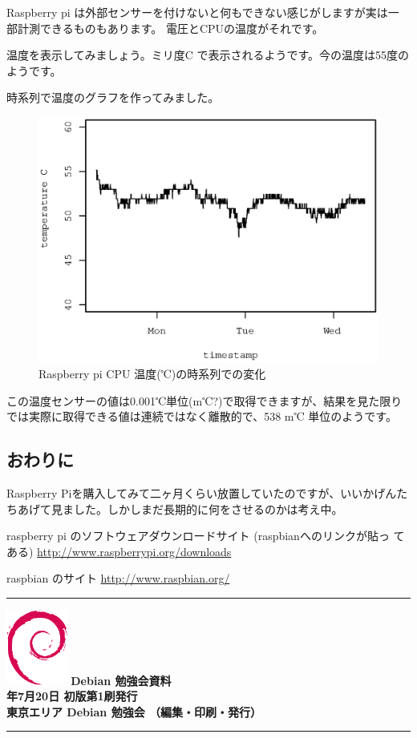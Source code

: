\documentclass[mingoth,a4paper]{jsarticle}
\newcommand{\debmtgyear}{2013}
\newcommand{\debmtgmonth}{7}
\newcommand{\debmtgdate}{20}
\begin{document}
Raspberry pi は外部センサーを付けないと何もできない感じがしますが実は一
部計測できるものもあります。
電圧とCPUの温度がそれです。

温度を表示してみましょう。ミリ度C で表示されるようです。今の温度は55度の
ようです。

時系列で温度のグラフを作ってみました。

\begin{figure}[H]
 \begin{center}
  \includegraphics[width=0.5\hsize]{image201307/temperature.eps}
  \caption{Raspberry pi CPU 温度(℃)の時系列での変化}
 \end{center}
\end{figure}

この温度センサーの値は0.001℃単位(m℃?)で取得できますが、結果を見た限り
では実際に取得できる値は連続ではなく離散的で、538 m℃ 単位のようです。

\subsection{おわりに}

Raspberry Piを購入してみて二ヶ月くらい放置していたのですが、いいかげんた
ちあげて見ました。しかしまだ長期的に何をさせるのかは考え中。

\begin{thebibliography}{}
  raspberry pi のソフトウェアダウンロードサイト (raspbianへのリンクが貼っ
てある)
\url{http://www.raspberrypi.org/downloads}
 
 raspbian のサイト \url{http://www.raspbian.org/}
\end{thebibliography}


\printindex

\cleartooddpage

\vspace*{15cm}
\hrule
\vspace{2mm}
\includegraphics[width=2cm]{image200502/openlogo-nd.eps}
\noindent \Large \bf Debian 勉強会資料\\
\noindent \normalfont \debmtgyear{}年\debmtgmonth{}月\debmtgdate{}日 \hspace{5mm}  初版第1刷発行\\
\noindent \normalfont 東京エリア Debian 勉強会 （編集・印刷・発行）\\
\hrule
\end{document}
